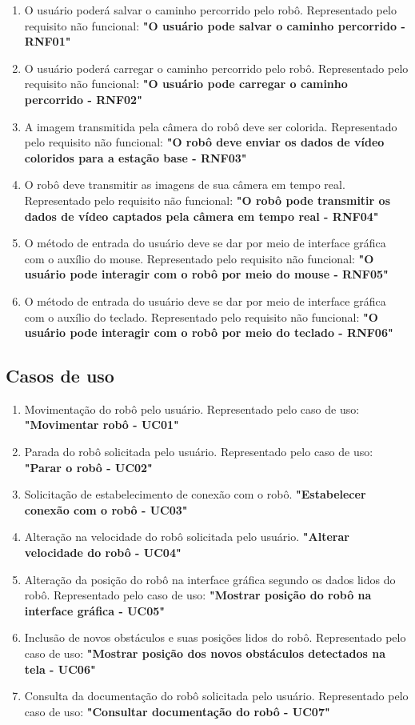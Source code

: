 \begin{enumerate}[topsep=0pt, partopsep=0pt, itemsep=0pt]
  \item O usuário poderá salvar o caminho percorrido pelo robô. Representado pelo requisito não funcional: \textbf{"O usuário pode salvar o caminho percorrido - RNF01"}
  \item O usuário poderá carregar o caminho percorrido pelo robô. Representado pelo requisito não funcional: \textbf{"O usuário pode carregar o caminho percorrido - RNF02"}
  \item A imagem transmitida pela câmera do robô deve ser colorida. Representado pelo requisito não funcional: \textbf{"O robô deve enviar os dados de vídeo coloridos para a estação base - RNF03"}
  \item O robô deve transmitir as imagens de sua câmera em tempo real. Representado pelo requisito não funcional: \textbf{"O robô pode transmitir os dados de vídeo captados pela câmera em tempo real - RNF04"}
  \item O método de entrada do usuário deve se dar por meio de interface gráfica com o auxílio do mouse. Representado pelo requisito não funcional: \textbf{"O usuário pode interagir com o robô por meio do mouse - RNF05"}
  \item O método de entrada do usuário deve se dar por meio de interface gráfica com o auxílio do teclado. Representado pelo requisito não funcional: \textbf{"O usuário pode interagir com o robô por meio do teclado - RNF06"}
\end{enumerate}


\subsection{Casos de uso}

\begin{enumerate}[topsep=0pt, partopsep=0pt, itemsep=0pt]
  \item Movimentação do robô pelo usuário. Representado pelo caso de uso: \textbf{"Movimentar robô - UC01"}
  \item Parada do robô solicitada pelo usuário. Representado pelo caso de uso: \textbf{"Parar o robô - UC02"}
  \item Solicitação de estabelecimento de conexão com o robô. \textbf{"Estabelecer conexão com o robô - UC03"}
  \item Alteração na velocidade do robô solicitada pelo usuário. \textbf{"Alterar velocidade do robô - UC04"}
  \item Alteração da posição do robô na interface gráfica segundo os dados lidos do robô. Representado pelo caso de uso: \textbf{"Mostrar posição do robô na interface gráfica - UC05"}
  \item Inclusão de novos obstáculos e suas posições lidos do robô. Representado pelo caso de uso: \textbf{"Mostrar posição dos novos obstáculos detectados na tela - UC06"}
  \item Consulta da documentação do robô solicitada pelo usuário. Representado pelo caso de uso: \textbf{"Consultar documentação do robô - UC07"}
\end{enumerate}

